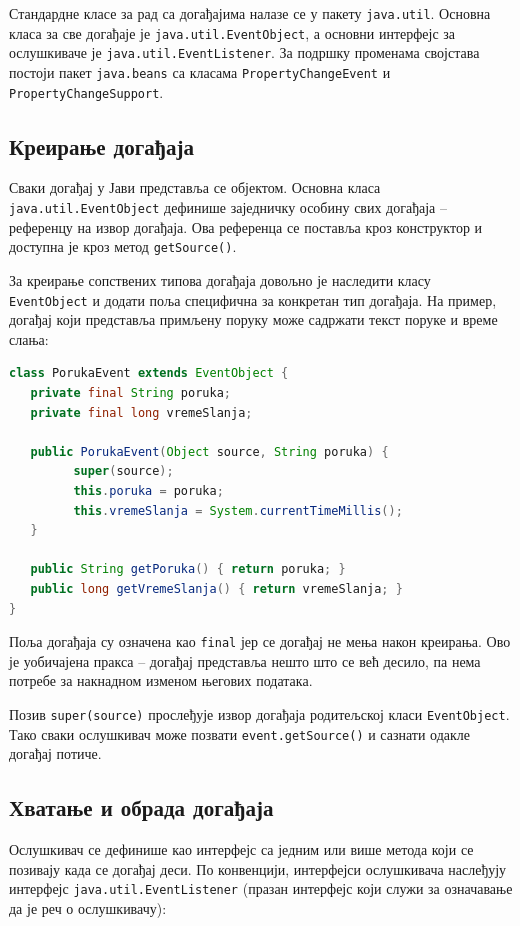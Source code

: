 Стандардне класе за рад са догађајима налазе се у пакету \texttt{java.util}. Основна класа за све догађаје је \texttt{java.util.EventObject}, а основни интерфејс за ослушкиваче је \texttt{java.util.EventListener}. За подршку променама својстава постоји пакет \texttt{java.beans} са класама \texttt{PropertyChangeEvent} и \texttt{PropertyChangeSupport}.


\subsection{Креирање догађаја}

Сваки догађај у Јави представља се објектом. Основна класа \texttt{java.util.EventObject} дефинише заједничку особину свих догађаја – референцу на извор догађаја. Ова референца се поставља кроз конструктор и доступна је кроз метод \texttt{getSource()}.

За креирање сопствених типова догађаја довољно је наследити класу \texttt{EventObject} и додати поља специфична за конкретан тип догађаја. На пример, догађај који представља примљену поруку може садржати текст поруке и време слања:


\begin{lstlisting}[language=Java]
class PorukaEvent extends EventObject {
   private final String poruka;
   private final long vremeSlanja;
 
   public PorukaEvent(Object source, String poruka) {
         super(source);
         this.poruka = poruka;
         this.vremeSlanja = System.currentTimeMillis();
   }
 
   public String getPoruka() { return poruka; }
   public long getVremeSlanja() { return vremeSlanja; }
}
\end{lstlisting}


Поља догађаја су означена као \texttt{final} јер се догађај не мења након креирања. Ово је уобичајена пракса – догађај представља нешто што се већ десило, па нема потребе за накнадном изменом његових података.

Позив \texttt{super(source)} прослеђује извор догађаја родитељској класи \texttt{EventObject}. Тако сваки ослушкивач може позвати \texttt{event.getSource()} и сазнати одакле догађај потиче.


\subsection{Хватање и обрада догађаја}

Ослушкивач се дефинише као интерфејс са једним или више метода који се позивају када се догађај деси. По конвенцији, интерфејси ослушкивача наслеђују интерфејс \texttt{java.util.EventListener} (празан интерфејс који служи за означавање да је реч о ослушкивачу):


